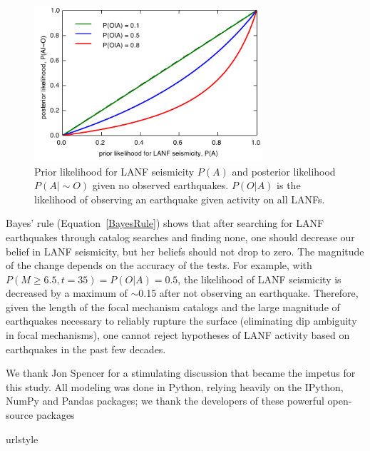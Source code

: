 \documentclass[twocolumn,grl]{AGUTeX}
\begin{document}
\begin{article}
\begin{figure}[t]
 \noindent\includegraphics[width=20pc]{./figures/posteriors.pdf}
 \caption{Prior likelihood for LANF seismicity $P(A)$ and posterior
 likelihood $P(A|\sim O)$ given no observed earthquakes.  
 $P(O|A)$ is the likelihood of observing an earthquake given activity
 on all LANFs.}
 \label{fig:posteriors}
\end{figure}
Bayes' rule (Equation~\ref{BayesRule}) shows that after searching for LANF 
earthquakes through catalog searches and finding none, one should decrease
our belief in LANF seismicity, but her beliefs should not drop to zero.  The
magnitude of the change depends on the accuracy of the tests. For example,
with $P(M\ge6.5, t=35) = P(O|A) = 0.5$, the likelihood of LANF seismicity
is decreased by a maximum of $\sim$0.15 after not observing an earthquake.
Therefore, given the length of the focal mechanism catalogs and the large
magnitude of earthquakes necessary to reliably rupture the surface
(eliminating dip ambiguity in focal mechanisms), one cannot reject hypotheses
of LANF activity based on earthquakes in the past few decades.


\begin{acknowledgements}
  We thank Jon Spencer for a stimulating discussion that became the
  impetus for this study.  All modeling was done in Python, relying heavily
  on the IPython, NumPy and Pandas packages; we thank the developers of these 
  powerful open-source packages
\end{acknowledgements}

\begin{thebibliography}{29}
\providecommand{\natexlab}[1]{#1}
\expandafter\ifx\csname urlstyle\endcsname\relax
  \providecommand{\doi}[1]{doi:\discretionary{}{}{}#1}\else
  \providecommand{\doi}{doi:\discretionary{}{}{}\begingroup
  \urlstyle{rm}\Url}\fi


\end{thebibliography}
\end{article}
\end{document}
